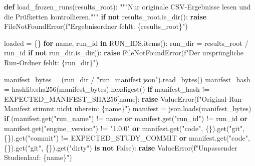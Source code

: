 \documentclass[
  ngerman,
  a4paper,
  DIV=11,
  oneside]{scrreprt}
\newenvironment{Shaded}{\begin{snugshade}}{\end{snugshade}}
\newcommand{\CommentTok}[1]{\textcolor[rgb]{0.37,0.37,0.37}{#1}}
\newcommand{\ControlFlowTok}[1]{\textcolor[rgb]{0.00,0.23,0.31}{\textbf{#1}}}
\newcommand{\KeywordTok}[1]{\textcolor[rgb]{0.00,0.23,0.31}{\textbf{#1}}}
\newcommand{\NormalTok}[1]{\textcolor[rgb]{0.00,0.23,0.31}{#1}}
\newcommand{\OperatorTok}[1]{\textcolor[rgb]{0.37,0.37,0.37}{#1}}
\newcommand{\PreprocessorTok}[1]{\textcolor[rgb]{0.68,0.00,0.00}{#1}}
\newcommand{\SpecialCharTok}[1]{\textcolor[rgb]{0.37,0.37,0.37}{#1}}
\newcommand{\SpecialStringTok}[1]{\textcolor[rgb]{0.13,0.47,0.30}{#1}}
\newcommand{\StringTok}[1]{\textcolor[rgb]{0.13,0.47,0.30}{#1}}
\newcommand{\VariableTok}[1]{\textcolor[rgb]{0.07,0.07,0.07}{#1}}
\begin{document}
\begin{Shaded}
\begin{Highlighting}[]
\KeywordTok{def}\NormalTok{ load\_frozen\_runs(results\_root):}
    \CommentTok{"""Nur originale CSV{-}Ergebnisse lesen und die Prüfketten kontrollieren."""}
    \ControlFlowTok{if} \KeywordTok{not}\NormalTok{ results\_root.is\_dir():}
        \ControlFlowTok{raise} \PreprocessorTok{FileNotFoundError}\NormalTok{(}\SpecialStringTok{f"Ergebnisordner fehlt: }\SpecialCharTok{\{}\NormalTok{results\_root}\SpecialCharTok{\}}\SpecialStringTok{"}\NormalTok{)}

\NormalTok{    loaded }\OperatorTok{=}\NormalTok{ \{\}}
    \ControlFlowTok{for}\NormalTok{ name, run\_id }\KeywordTok{in}\NormalTok{ RUN\_IDS.items():}
\NormalTok{        run\_dir }\OperatorTok{=}\NormalTok{ results\_root }\OperatorTok{/}\NormalTok{ run\_id}
        \ControlFlowTok{if} \KeywordTok{not}\NormalTok{ run\_dir.is\_dir():}
            \ControlFlowTok{raise} \PreprocessorTok{FileNotFoundError}\NormalTok{(}\SpecialStringTok{f"Der ursprüngliche Run{-}Ordner fehlt: }\SpecialCharTok{\{}\NormalTok{run\_dir}\SpecialCharTok{\}}\SpecialStringTok{"}\NormalTok{)}

\NormalTok{        manifest\_bytes }\OperatorTok{=}\NormalTok{ (run\_dir }\OperatorTok{/} \StringTok{"run\_manifest.json"}\NormalTok{).read\_bytes()}
\NormalTok{        manifest\_hash }\OperatorTok{=}\NormalTok{ hashlib.sha256(manifest\_bytes).hexdigest()}
        \ControlFlowTok{if}\NormalTok{ manifest\_hash }\OperatorTok{!=}\NormalTok{ EXPECTED\_MANIFEST\_SHA256[name]:}
            \ControlFlowTok{raise} \PreprocessorTok{ValueError}\NormalTok{(}\SpecialStringTok{f"Original{-}Run{-}Manifest stimmt nicht überein: }\SpecialCharTok{\{}\NormalTok{name}\SpecialCharTok{\}}\SpecialStringTok{"}\NormalTok{)}
\NormalTok{        manifest }\OperatorTok{=}\NormalTok{ json.loads(manifest\_bytes)}
        \ControlFlowTok{if}\NormalTok{ (manifest.get(}\StringTok{"run\_name"}\NormalTok{) }\OperatorTok{!=}\NormalTok{ name}
                \KeywordTok{or}\NormalTok{ manifest.get(}\StringTok{"run\_id"}\NormalTok{) }\OperatorTok{!=}\NormalTok{ run\_id}
                \KeywordTok{or}\NormalTok{ manifest.get(}\StringTok{"engine\_version"}\NormalTok{) }\OperatorTok{!=} \StringTok{"1.0.0"}
                \KeywordTok{or}\NormalTok{ manifest.get(}\StringTok{"code"}\NormalTok{, \{\}).get(}\StringTok{"git"}\NormalTok{, \{\}).get(}\StringTok{"commit"}\NormalTok{) }\OperatorTok{!=}\NormalTok{ EXPECTED\_STUDY\_COMMIT}
                \KeywordTok{or}\NormalTok{ manifest.get(}\StringTok{"code"}\NormalTok{, \{\}).get(}\StringTok{"git"}\NormalTok{, \{\}).get(}\StringTok{"dirty"}\NormalTok{) }\KeywordTok{is} \KeywordTok{not} \VariableTok{False}\NormalTok{):}
            \ControlFlowTok{raise} \PreprocessorTok{ValueError}\NormalTok{(}\SpecialStringTok{f"Unpassender Studienlauf: }\SpecialCharTok{\{}\NormalTok{name}\SpecialCharTok{\}}\SpecialStringTok{"}\NormalTok{)}


\end{Highlighting}
\end{Shaded}
\end{document}
